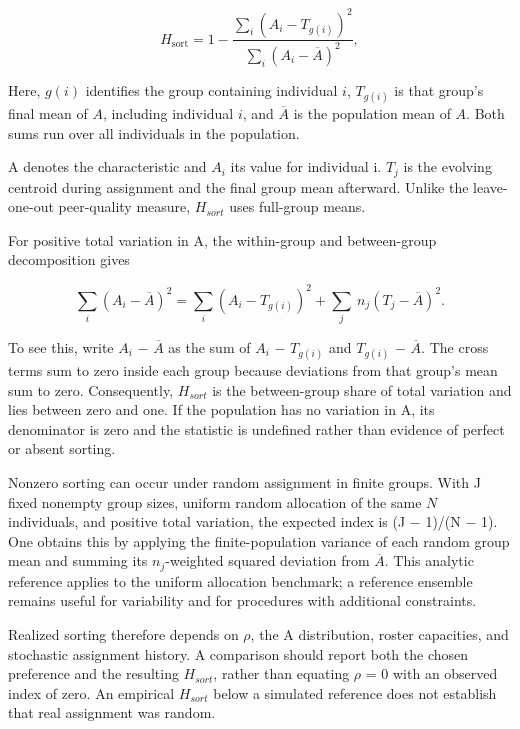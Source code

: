 \[
H_{\text{sort}} = 1 - \frac{\sum_{i}^{}\left( A_{i} - T_{g(i)} \right)^{2}}{\sum_{i}^{}\left( A_{i} - \overline{A} \right)^{2}},
\]

Here, \(g(i)\) identifies the group containing individual \(i\), \(T_{g(i)}\) is that group's final mean of \(A\), including individual \(i\), and \(\overline{A}\) is the population mean of \(A\). Both sums run over all individuals in the population.

A denotes the characteristic and \(A_{i}\) its value for individual i. \(T_{j}\) is the evolving centroid during assignment and the final group mean afterward. Unlike the leave-one-out peer-quality measure, \(H_{sort}\) uses full-group means.

For positive total variation in A, the within-group and between-group decomposition gives

\[
\sum_{i}(A_{i} - \overline{A})^{2} = \sum_{i}(A_{i} - T_{g(i)})^{2} + \sum_{j}\ n_{j}(T_{j} - \overline{A})^{2}.
\]

To see this, write \(A_{i}\) \ensuremath{-} \(\overline{A}\) as the sum of \(A_{i}\) \ensuremath{-} \(T_{g(i)}\) and \(T_{g(i)}\) \ensuremath{-} \(\overline{A}\). The cross terms sum to zero inside each group because deviations from that group's mean sum to zero. Consequently, \(H_{sort}\) is the between-group share of total variation and lies between zero and one. If the population has no variation in A, its denominator is zero and the statistic is undefined rather than evidence of perfect or absent sorting.

Nonzero sorting can occur under random assignment in finite groups. With J fixed nonempty group sizes, uniform random allocation of the same \(N\) individuals, and positive total variation, the expected index is (J \ensuremath{-} 1)/(N \ensuremath{-} 1). One obtains this by applying the finite-population variance of each random group mean and summing its \(n_{j}\)-weighted squared deviation from \(\overline{A}\). This analytic reference applies to the uniform allocation benchmark; a reference ensemble remains useful for variability and for procedures with additional constraints.

Realized sorting therefore depends on \(\rho\), the A distribution, roster capacities, and stochastic assignment history. A comparison should report both the chosen preference and the resulting \(H_{sort}\), rather than equating \ensuremath{\rho} = 0 with an observed index of zero. An empirical \(H_{sort}\) below a simulated reference does not establish that real assignment was random.

